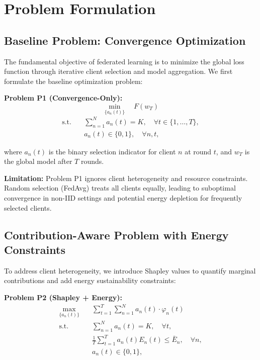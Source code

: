 \section{Problem Formulation}

\subsection{Baseline Problem: Convergence Optimization}

The fundamental objective of federated learning is to minimize the global loss function through iterative client selection and model aggregation. We first formulate the baseline optimization problem:

\textbf{Problem P1 (Convergence-Only):}
\begin{equation}
\min_{\{a_n(t)\}} \quad F(w_T)
\end{equation}
\begin{subequations}
\begin{align}
\text{s.t.} \quad & \sum_{n=1}^{N} a_n(t) = K, \quad \forall t \in \{1, \ldots, T\}, \\
& a_n(t) \in \{0, 1\}, \quad \forall n, t,
\end{align}
\end{subequations}

where $a_n(t)$ is the binary selection indicator for client $n$ at round $t$, and $w_T$ is the global model after $T$ rounds.

\textbf{Limitation:} Problem P1 ignores client heterogeneity and resource constraints. Random selection (FedAvg) treats all clients equally, leading to suboptimal convergence in non-IID settings and potential energy depletion for frequently selected clients.

\subsection{Contribution-Aware Problem with Energy Constraints}

To address client heterogeneity, we introduce Shapley values to quantify marginal contributions and add energy sustainability constraints:

\textbf{Problem P2 (Shapley + Energy):}
\begin{subequations}
\begin{align}
\max_{\{a_n(t)\}} \quad & \sum_{t=1}^{T} \sum_{n=1}^{N} a_n(t) \cdot \varphi_n(t) \\
\text{s.t.} \quad & \sum_{n=1}^{N} a_n(t) = K, \quad \forall t, \\
& \frac{1}{T} \sum_{t=1}^{T} a_n(t) E_n(t) \leq \bar{E}_n, \quad \forall n, \\
& a_n(t) \in \{0, 1\},
\end{align}
\end{subequations}


